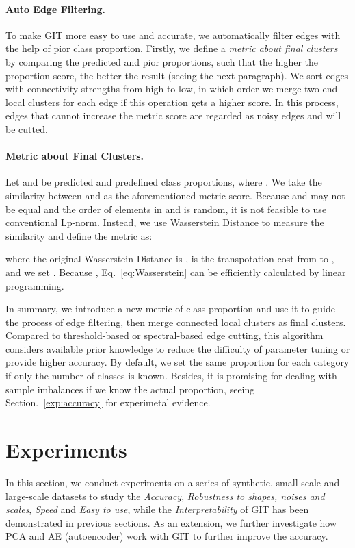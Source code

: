 \documentclass[letterpaper]{article} \usepackage{aaai22}  \usepackage{times}  \usepackage{helvet}  \usepackage{courier}  \usepackage[hyphens]{url}  \usepackage{graphicx} \urlstyle{rm} \def\UrlFont{\rm}  \usepackage{natbib}  \usepackage{caption} \DeclareCaptionStyle{ruled}{labelfont=normalfont,labelsep=colon,strut=off} \frenchspacing  \setlength{\pdfpagewidth}{8.5in}  \setlength{\pdfpageheight}{11in}  \usepackage{subfigure}
\begin{document}
\paragraph{Auto Edge Filtering.}  To make GIT more easy to use and accurate, we automatically filter edges with the help of pior class proportion. Firstly, we define a \textit{metric about final clusters} by comparing the predicted and pior proportions, such that the higher the proportion score, the better the result (seeing the next paragraph). We sort edges with connectivity strengths from high to low, in which order we merge two end local clusters for each edge if this operation gets a higher score. In this process, edges that cannot increase the metric score are regarded as noisy edges and will be cutted.


\paragraph{Metric about Final Clusters.} Let  and   be predicted and predefined class proportions, where . We take the similarity between  and  as the aforementioned metric score. Because  and  may not be equal and the order of elements in  and  is random, it is not feasible to use conventional Lp-norm. Instead, we use Wasserstein Distance to measure the similarity and define the metric  as:

where the original Wasserstein Distance is  ,  is the transpotation cost from  to  , and we set . Because , Eq.~\ref{eq:Wasserstein} can be efficiently calculated by linear programming.

\quad

In summary, we introduce a new metric of class proportion and use it to guide the process of edge filtering, then merge connected local clusters as final clusters. Compared to threshold-based or spectral-based edge cutting, this algorithm considers available prior knowledge to reduce the difficulty of parameter tuning or provide higher accuracy. By default, we set the same proportion for each category if only the number of classes is known. Besides, it is promising for dealing with sample imbalances if we know the actual proportion, seeing Section.~\ref{exp:accuracy} for experimetal evidence. 

\section{Experiments}

In this section, we conduct experiments on a series of synthetic, small-scale and large-scale datasets to study the \textit{Accuracy}, \textit{Robustness to shapes, noises and scales}, \textit{Speed} and \textit{Easy to use}, while the \textit{Interpretability} of GIT has been demonstrated in previous sections. As an extension, we further investigate how PCA and AE (autoencoder) work with GIT to further improve the accuracy.
\end{document}
